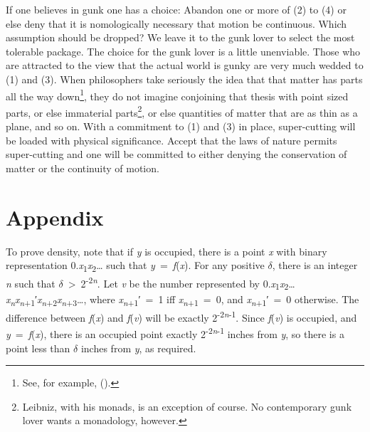 \documentclass[
  10pt,
  letterpaper,
  DIV=11,
  numbers=noendperiod,
  twoside]{scrartcl}
\begin{document}
If one believes in gunk one has a choice: Abandon one or more of (2) to
(4) or else deny that it is nomologically necessary that motion be
continuous. Which assumption should be dropped? We leave it to the gunk
lover to select the most tolerable package. The choice for the gunk
lover is a little unenviable. Those who are attracted to the view that
the actual world is gunky are very much wedded to (1) and (3). When
philosophers take seriously the idea that that matter has parts all the
way down\footnote{See, for example,
  ().}, they do not imagine
conjoining that thesis with point sized parts, or else immaterial
parts\footnote{Leibniz, with his monads, is an exception of course. No
  contemporary gunk lover wants a monadology, however.}, or else
quantities of matter that are as thin as a plane, and so on. With a
commitment to (1) and (3) in place, super-cutting will be loaded with
physical significance. Accept that the laws of nature permits
super-cutting and one will be committed to either denying the
conservation of matter or the continuity of motion.

\section*{Appendix}\label{appendix}

To prove density, note that if \emph{y} is occupied, there is a point
\emph{x} with binary representation
0.\emph{x}\textsubscript{1}\emph{x}\textsubscript{2}\ldots{} such that
\emph{y}~=~\emph{f}(\emph{x}). For any positive \({\delta}\), there is
an integer \emph{n} such that
\({\delta}\)~\textgreater~2\textsuperscript{-2\emph{n}}. Let \emph{v} be
the number represented by
0.\emph{x}\textsubscript{1}\emph{x}\textsubscript{2}\ldots{}\emph{x\textsubscript{n}x\textsubscript{n}}\textsubscript{+1}′\emph{x\textsubscript{n}}\textsubscript{+2}\emph{x\textsubscript{n}}\textsubscript{+3}\ldots,
where \emph{x\textsubscript{n}}\textsubscript{+1}′~=~1 iff
\emph{x\textsubscript{n}}\textsubscript{+1}~=~0, and
\emph{x\textsubscript{n}}\textsubscript{+1}′~=~0 otherwise. The
difference between \emph{f}(\emph{x}) and \emph{f}(\emph{v}) will be
exactly 2\textsuperscript{-2\emph{n}-1}. Since \emph{f}(\emph{v}) is
occupied, and \emph{y}~=~\emph{f}(\emph{x}), there is an occupied point
exactly 2\textsuperscript{-2\emph{n}-1} inches from \emph{y}, so there
is a point less than \({\delta}\) inches from \emph{y}, as required.
\end{document}
